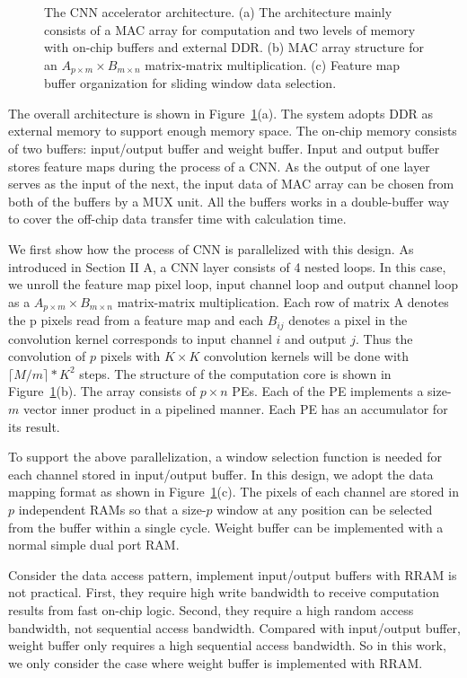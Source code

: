 \begin{figure}[t]
  \caption{The CNN accelerator architecture. (a) The architecture mainly consists of a MAC array for computation and two levels of memory with on-chip buffers and external DDR. (b) MAC array structure for an $A_{p\times m}\times B_{m\times n}$ matrix-matrix multiplication. (c) Feature map buffer organization for sliding window data selection.}
  \vspace{-15pt}
  \label{fig:arch}
\end{figure}

The overall architecture is shown in Figure~\ref{fig:arch}(a). The system adopts DDR as external memory to support enough memory space. The on-chip memory consists of two buffers: input/output buffer and weight buffer. Input and output buffer stores feature maps during the process of a CNN. As the output of one layer serves as the input of the next, the input data of MAC array can be chosen from both of the buffers by a MUX unit. All the buffers works in a double-buffer way to cover the off-chip data transfer time with calculation time.

We first show how the process of CNN is parallelized with this design. As introduced in Section II A, a CNN layer consists of 4 nested loops. In this case, we unroll the feature map pixel loop, input channel loop and output channel loop as a $A_{p\times m}\times B_{m\times n}$ matrix-matrix multiplication. Each row of matrix A denotes the p pixels read from a feature map and each $B_{ij}$ denotes a pixel in the convolution kernel corresponds to input channel $i$ and output $j$. Thus the convolution of $p$ pixels with $K\times K$ convolution kernels will be done with $\lceil M/m\rceil*K^2$ steps. The structure of the computation core is shown in Figure~\ref{fig:arch}(b). The array consists of $p\times n$ PEs. Each of the PE implements a size-$m$ vector inner product in a pipelined manner. Each PE has an accumulator for its result. 

To support the above parallelization, a window selection function is needed for each channel stored in input/output buffer. In this design, we adopt the data mapping format as shown in Figure~\ref{fig:arch}(c). The pixels of each channel are stored in $p$ independent RAMs so that a size-$p$ window at any position can be selected from the buffer within a single cycle. Weight buffer can be implemented with a normal simple dual port RAM.

Consider the data access pattern, implement input/output buffers with RRAM is not practical. First, they require high write bandwidth to receive computation results from fast on-chip logic. Second, they require a high random access bandwidth, not sequential access bandwidth. Compared with input/output buffer, weight buffer only requires a high sequential access bandwidth. So in this work, we only consider the case where weight buffer is implemented with RRAM.



